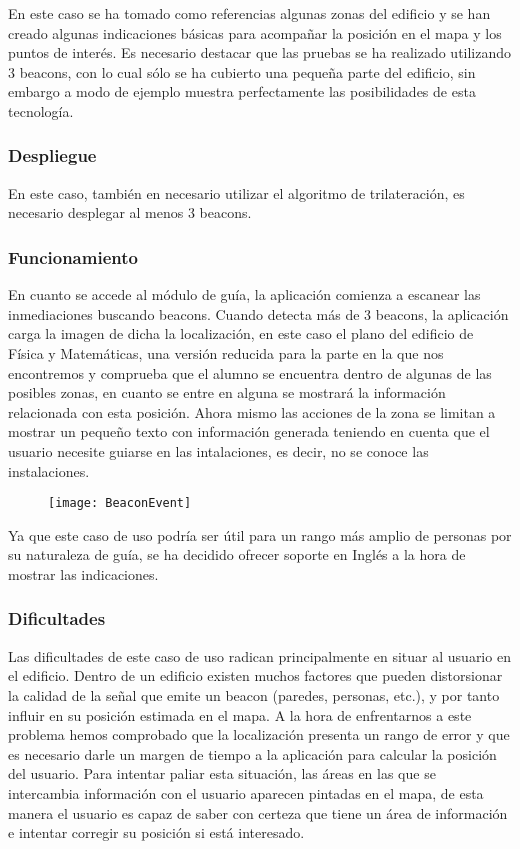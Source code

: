 En este caso se ha tomado como referencias algunas zonas del edificio y se han creado algunas indicaciones básicas para acompañar la posición en el mapa y los puntos de interés. Es necesario destacar que las pruebas se ha realizado utilizando 3 beacons, con lo cual sólo se ha cubierto una pequeña parte del edificio, sin embargo a modo de ejemplo muestra perfectamente las posibilidades de esta tecnología.

\subsubsection{Despliegue}

En este caso, también en necesario utilizar el algoritmo de trilateración, es necesario desplegar al menos 3 beacons.

\subsubsection{Funcionamiento}


En cuanto se accede al módulo de guía, la aplicación comienza a escanear las inmediaciones buscando beacons. Cuando detecta más de 3 beacons, la aplicación carga la imagen de dicha la localización, en este caso el plano del edificio de Física y Matemáticas, una versión reducida para la parte en la que nos encontremos y comprueba que el alumno se encuentra dentro de algunas de las posibles zonas, en cuanto se entre en alguna se mostrará la información relacionada con esta posición. Ahora mismo las acciones de la zona se limitan a mostrar un pequeño texto con información generada teniendo en cuenta que el usuario necesite guiarse en las intalaciones, es decir, no se conoce las instalaciones.

\begin{figure}[H]
	\centering
	\texttt{[image: BeaconEvent]}
	\label{fig:eventBeacon}
\end{figure}

Ya que este caso de uso podría ser útil para un rango más amplio de personas por su naturaleza de guía, se ha decidido ofrecer soporte en Inglés a la hora de mostrar las indicaciones.

\subsubsection{Dificultades}

Las dificultades de este caso de uso radican principalmente en situar al usuario en el edificio. Dentro de un edificio existen muchos factores que pueden distorsionar la calidad de la señal que emite un beacon (paredes, personas, etc.), y por tanto influir en su posición estimada en el mapa. A la hora de enfrentarnos a este problema hemos comprobado que la localización presenta un rango de error y que es necesario darle un margen de tiempo a la aplicación para calcular la posición del usuario. Para intentar paliar esta situación, las áreas en las que se intercambia información con el usuario aparecen pintadas en el mapa, de esta manera el usuario es capaz de saber con certeza que tiene un área de información e intentar corregir su posición si está interesado. 

